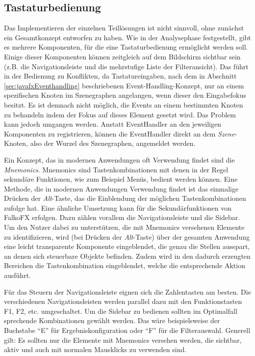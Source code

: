 \subsection{Tastaturbedienung} \label{sec:interactionKeyboard}
Das Implementieren der einzelnen Teillösungen ist nicht sinnvoll, ohne zunächst ein Gesamtkonzept entworfen zu haben. Wie in der Analysephase festgestellt, gibt es mehrere Komponenten, für die eine Tastaturbedienung ermöglicht werden soll. Einige dieser Komponenten können zeitgleich auf dem Bildschirm sichtbar sein (z.B. die Navigationsleiste und die mehrstufige Liste der Filteransicht). Das führt in der Bedienung zu Konflikten, da Tastatureingaben, nach dem in Abschnitt \ref{sec:javafxEventhandling} beschriebenen Event-Handling-Konzept, nur an einem spezifischen Knoten im Szenegraphen angelangen, wenn dieser den Eingabefokus besitzt. Es ist demnach nicht möglich, die Events an einem bestimmten Knoten zu behandeln indem der Fokus auf dieses Element gesetzt wird. Das Problem kann jedoch umgangen werden. Anstatt EventHandler an den jeweiligen Komponenten zu registrieren, können die EventHandler direkt an dem \textit{Szene}-Knoten, also der Wurzel des Szenegraphen, angemeldet werden.\par
{}
Ein Konzept, das in modernen Anwendungen oft Verwendung findet sind die \textit{Mnemonics}. Mnemonics sind Tastenkombinationen mit denen in der Regel sekundäre Funktionen, wie zum Beispiel Menüs, bedient werden können. Eine Methode, die in modernen Anwendungen Verwendung findet ist das einmalige Drücken der \textit{Alt}-Taste, das die Einblendung der möglichen Tastenkombinationen zufolge hat. Eine ähnliche Umsetzung kann für die Sekundärfunktionen von FalkoFX erfolgen. Dazu zählen vorallem die Navigationsleiste und die Sidebar. Um den Nutzer dabei zu unterstützen, die mit Mnemonics versehenen Elemente zu identifizieren, wird (bei Drücken der \textit{Alt}-Taste) über der gesamten Anwendung eine leicht transparente Komponente eingeblendet, die genau die Stellen ausspart, an denen sich steuerbare Objekte befinden. Zudem wird in den dadurch erzeugten Bereichen die Tastenkombination eingeblendet, welche die entsprechende Aktion ausführt.\par
Für das Steuern der Navigationsleiste eignen sich die Zahlentasten am besten. Die verschiedenen Navigationsleisten werden parallel dazu mit den Funktionstasten F1, F2, etc. umgeschaltet. Um die Sidebar zu bedienen sollten im Optimalfall sprechende Kombinationen gewählt werden. Das wäre beispielsweise der Buchstabe \enquote{E} für Ergebniskonfiguration oder \enquote{F} für die Filterauswahl. Generell gilt: Es sollten nur die Elemente mit Mnemonics versehen werden, die sichtbar, aktiv und auch mit normalen Mausklicks zu verwenden sind.\par
